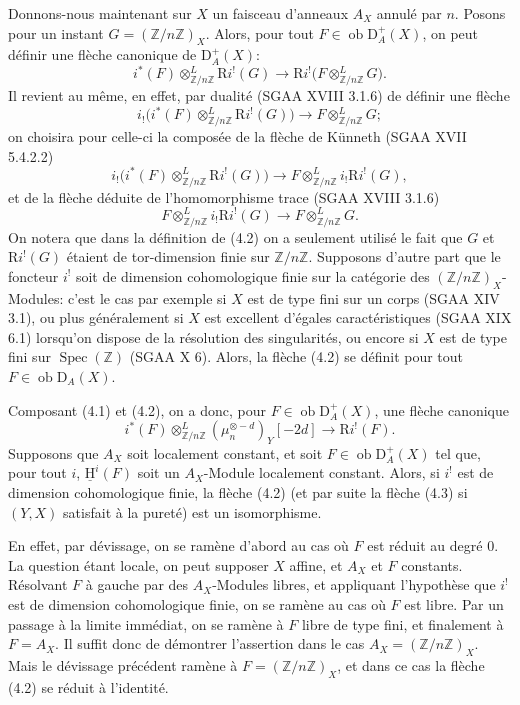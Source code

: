 \documentclass[11pt]{article}
\providecommand{\uH}{\underline{\mathrm H}}
\DeclareMathOperator{\Spec}{Spec}
\newcommand{\R}{\mathrm{R}}
\newcommand{\D}{\mathrm{D}}
\newcommand{\Z}{\mathbb{Z}}
\newcommand{\ob}{\operatorname{ob}}
\providecommand{\ob}{\operatorname{ob}}
\providecommand{\R}{\mathrm R}
\providecommand{\Z}{\mathbb Z}
\providecommand{\Spec}{\operatorname{Spec}}
\providecommand{\Spec}{\operatorname{Spec}}
\providecommand{\Spec}{\operatorname{Spec}}
\providecommand{\Spec}{\operatorname{Spec}}
\begin{document}
Donnons-nous maintenant sur $X$ un faisceau d'anneaux $A_X$ annulé par $n$. Posons pour un instant $G=(\Z/n\Z)_X$. Alors, pour tout $F\in\ob\D_A^+(X)$, on peut définir une flèche canonique de $\D_A^+(X)$:
\begin{equation}\tag{4.2}
        i^*(F)\otimes^L_{\Z/n\Z} \R i^!(G)\longrightarrow \R i^!\bigl(F\otimes^L_{\Z/n\Z}G\bigr).
\end{equation}
Il revient au même, en effet, par dualité (SGAA XVIII 3.1.6) de définir une flèche
\[
        i_!\bigl(i^*(F)\otimes^L_{\Z/n\Z}\R i^!(G)\bigr)\longrightarrow F\otimes^L_{\Z/n\Z}G;
\]
on choisira pour celle-ci la composée de la flèche de Künneth (SGAA XVII 5.4.2.2)
\[
        i_!\bigl(i^*(F)\otimes^L_{\Z/n\Z}\R i^!(G)\bigr)\longrightarrow F\otimes^L_{\Z/n\Z}i_!\R i^!(G),
\]
et de la flèche déduite de l'homomorphisme trace (SGAA XVIII 3.1.6)
\[
        F\otimes^L_{\Z/n\Z}i_!\R i^!(G)\longrightarrow F\otimes^L_{\Z/n\Z}G.
\]
On notera que dans la définition de (4.2) on a seulement utilisé le fait que $G$ et $\R i^!(G)$ étaient de tor-dimension finie sur $\Z/n\Z$. Supposons d'autre part que le foncteur $i^!$ soit de dimension cohomologique finie sur la catégorie des $(\Z/n\Z)_X$-Modules: c'est le cas par exemple si $X$ est de type fini sur un corps (SGAA XIV 3.1), ou plus généralement si $X$ est excellent d'égales caractéristiques (SGAA XIX 6.1) lorsqu'on dispose de la résolution des singularités, ou encore si $X$ est de type fini sur $\Spec(\Z)$ (SGAA X 6). Alors, la flèche (4.2) se définit pour tout $F\in\ob\D_A(X)$.

Composant (4.1) et (4.2), on a donc, pour $F\in\ob\D_A^+(X)$, une flèche canonique
\begin{equation}\tag{4.3}
        i^*(F)\otimes^L_{\Z/n\Z}(\mu_n^{\otimes -d})_Y[-2d]\longrightarrow \R i^!(F).
\end{equation}
Supposons que $A_X$ soit localement constant, et soit $F\in\ob\D_A^+(X)$ tel que, pour tout $i$, $\uH^i(F)$ soit un $A_X$-Module localement constant. Alors, si $i^!$ est de dimension cohomologique finie, la flèche (4.2) (et par suite la flèche (4.3) si $(Y,X)$ satisfait à la pureté) est un isomorphisme.

En effet, par dévissage, on se ramène d'abord au cas où $F$ est réduit au degré $0$. La question étant locale, on peut supposer $X$ affine, et $A_X$ et $F$ constants. Résolvant $F$ à gauche par des $A_X$-Modules libres, et appliquant l'hypothèse que $i^!$ est de dimension cohomologique finie, on se ramène au cas où $F$ est libre. Par un passage à la limite immédiat, on se ramène à $F$ libre de type fini, et finalement à $F=A_X$. Il suffit donc de démontrer l'assertion dans le cas $A_X=(\Z/n\Z)_X$. Mais le dévissage précédent ramène à $F=(\Z/n\Z)_X$, et dans ce cas la flèche (4.2) se réduit à l'identité.
\end{document}
